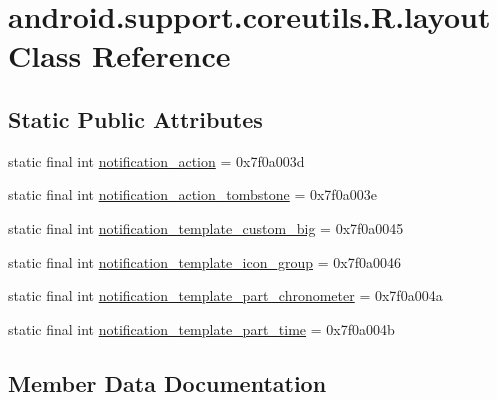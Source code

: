\hypertarget{classandroid_1_1support_1_1coreutils_1_1R_1_1layout}{}\section{android.\+support.\+coreutils.\+R.\+layout Class Reference}
\label{classandroid_1_1support_1_1coreutils_1_1R_1_1layout}
\subsection*{Static Public Attributes}
\begin{DoxyCompactItemize}
\item 
static final int \mbox{\hyperlink{classandroid_1_1support_1_1coreutils_1_1R_1_1layout_a5e1804f7a96ee0ab4e11a27875be0951}{notification\+\_\+action}} = 0x7f0a003d
\item 
static final int \mbox{\hyperlink{classandroid_1_1support_1_1coreutils_1_1R_1_1layout_a6d1bc2179e1826704db862bcedbdb322}{notification\+\_\+action\+\_\+tombstone}} = 0x7f0a003e
\item 
static final int \mbox{\hyperlink{classandroid_1_1support_1_1coreutils_1_1R_1_1layout_a1e82ecf13e5dff977c5ab5e5486ce4fc}{notification\+\_\+template\+\_\+custom\+\_\+big}} = 0x7f0a0045
\item 
static final int \mbox{\hyperlink{classandroid_1_1support_1_1coreutils_1_1R_1_1layout_ac37f0494791c27289807b7312e952167}{notification\+\_\+template\+\_\+icon\+\_\+group}} = 0x7f0a0046
\item 
static final int \mbox{\hyperlink{classandroid_1_1support_1_1coreutils_1_1R_1_1layout_a3290b638115231674c843239185ff25f}{notification\+\_\+template\+\_\+part\+\_\+chronometer}} = 0x7f0a004a
\item 
static final int \mbox{\hyperlink{classandroid_1_1support_1_1coreutils_1_1R_1_1layout_ac91cfa7131f75c5f3bed1d28fce1b717}{notification\+\_\+template\+\_\+part\+\_\+time}} = 0x7f0a004b
\end{DoxyCompactItemize}


\subsection{Member Data Documentation}
\mbox{\label{classandroid_1_1support_1_1coreutils_1_1R_1_1layout_a5e1804f7a96ee0ab4e11a27875be0951}} 
